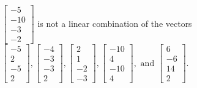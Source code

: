 \begin{exercise}
\begin{exerciseStatement}
  \end{exerciseStatement}
  \begin{exerciseAnswer}
   \(\left[\begin{array}{c}
-5 \\
-10 \\
-3 \\
-2
\end{array}\right]\) 
  	 is not  
	a linear combination of the vectors \(\left[\begin{array}{c}
-5 \\
2 \\
-5 \\
2
\end{array}\right] , \left[\begin{array}{c}
-4 \\
-3 \\
-3 \\
2
\end{array}\right] , \left[\begin{array}{c}
2 \\
1 \\
-2 \\
-3
\end{array}\right] , \left[\begin{array}{c}
-10 \\
4 \\
-10 \\
4
\end{array}\right] , \text{ and } \left[\begin{array}{c}
6 \\
-6 \\
14 \\
2
\end{array}\right]\).

	
  


  \end{exerciseAnswer}
\end{exercise}